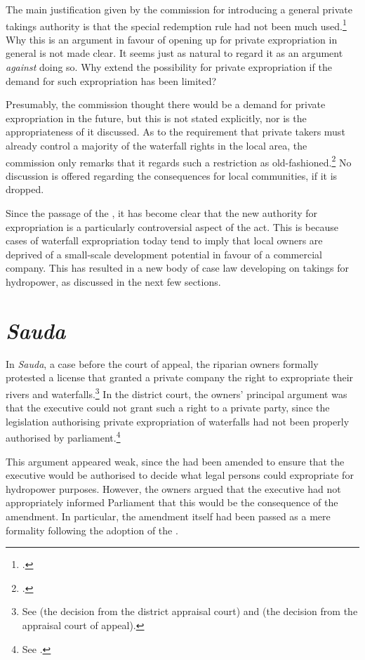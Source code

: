 The main justification given by the commission for introducing a general private takings authority is that the special redemption rule had not been much used.\footcite[236]{nou94} Why this is an argument in favour of opening up for private expropriation in general is not made clear. It seems just as natural to regard it as an argument {\it against} doing so. Why extend the possibility for private expropriation if the demand for such expropriation has been limited?

Presumably, the commission thought there would be a demand for private expropriation in the future, but this is not stated explicitly, nor is the appropriateness of it discussed. As to the requirement that private takers must already control a majority of the waterfall rights in the local area, the commission only remarks that it regards such a restriction as old-fashioned.\footcite[236]{nou94} No discussion is offered regarding the consequences for local communities, if it is dropped.

Since the passage of the \cite{wra00}, it has become clear that the new authority for expropriation is a particularly controversial aspect of the act. This is because cases of waterfall expropriation today tend to imply that local owners are deprived of a small-scale development potential in favour of a commercial company. This has resulted in a new body of case law developing on takings for hydropower, as discussed in the next few sections.

\section{{\it Sauda}}\label{sec:5:5:1}

In {\it Sauda}, a case before the court of appeal, the riparian owners formally protested a license that granted a private company the right to expropriate their rivers and waterfalls.\footnote{See \cite{sauda07} (the decision from the district appraisal court) and \cite{sauda09} (the decision from the appraisal court of appeal).} In the district court, the owners' principal argument was that the executive could not grant such a right to a private party, since the legislation authorising private expropriation of waterfalls had not been properly authorised by parliament.\footnote{See \cite{sauda07}.}

This argument appeared weak, since the \cite{ea59} had been amended to ensure that the executive would be authorised to decide what legal persons could expropriate for hydropower purposes. However, the owners argued that the executive had not appropriately informed Parliament that this would be the consequence of the amendment. In particular, the amendment itself had been passed as a mere formality following the adoption of the \cite{wra00}. 


